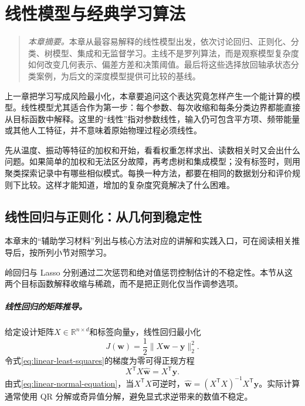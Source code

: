 ﻿\chapter{线性模型与经典学习算法}

\begin{quote}\small
\textit{本章摘要。}本章从最容易解释的线性模型出发，依次讨论回归、正则化、分类、树模型、集成和无监督学习。主线不是罗列算法，而是观察模型复杂度如何改变几何表示、偏差方差和决策阈值。最后将这些选择放回轴承状态分类案例，为后文的深度模型提供可比较的基线。
\end{quote}

上一章把学习写成风险最小化，本章要追问这个表达究竟怎样产生一个能计算的模型。线性模型尤其适合作为第一步：每个参数、每次收缩和每条分类边界都能直接从目标函数中解释。这里的“线性”指对参数线性，输入仍可包含平方项、频带能量或其他人工特征，并不意味着原始物理过程必须线性。

先从温度、振动等特征的加权和开始，看看权重怎样求出、读数相关时又会出什么问题。如果简单的加权和无法区分故障，再考虑树和集成模型；没有标签时，则用聚类探索记录中有哪些相似模式。每换一种方法，都要在相同的数据划分和评价规则下比较。这样才能知道，增加的复杂度究竟解决了什么困难。

\section{线性回归与正则化：从几何到稳定性}

本章末的“辅助学习材料”列出与核心方法对应的讲解和实践入口，可在阅读相关推导后，按所列小节对照学习。

岭回归与 Lasso 分别通过二次惩罚和绝对值惩罚控制估计的不稳定性\cite{hoerl1970ridge,tibshirani1996lasso}。本节从这两个目标函数解释收缩与稀疏，而不是把正则化仅当作调参选项。
\paragraph{线性回归的矩阵推导。}
给定设计矩阵$X\in\mathbb{R}^{n\times d}$和标签向量$\bm{y}$，线性回归最小化
\begin{equation}
 J(\bm{w})=\frac12\|X\bm{w}-\bm{y}\|_2^2.\label{eq:linear-least-squares}
\end{equation}
令式\eqref{eq:linear-least-squares}的梯度为零可得正规方程
\begin{equation}
 X^{\mathsf T}X\hat{\bm{w}}=X^{\mathsf T}\bm{y}.\label{eq:linear-normal-equation}
\end{equation}
由式\eqref{eq:linear-normal-equation}，当$X^{\mathsf T}X$可逆时，$\hat{\bm{w}}=(X^{\mathsf T}X)^{-1}X^{\mathsf T}\bm{y}$。实际计算通常使用 QR 分解或奇异值分解，避免显式求逆带来的数值不稳定。

